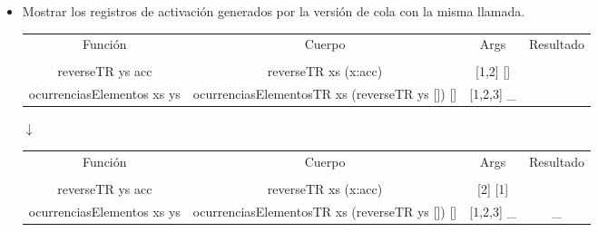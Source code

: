 \begin{enumerate}
{\begin{itemize}
{\begin{lstlisting}[language=Haskell]
{- occurencesTR: Funcion basada en recursion de cola que toma como argumentos 
    un elemento y una lista y devuelve la cantidad de veces que aparece el 
    elemento en la lista. 
    Debe iniciarse con occurencesTR _ _ 0, para su correcto funcionamiento. -}
occurencesTR :: Eq a => a -> [a] -> Int -> Int
occurencesTR _ [] acc = acc
occurencesTR x (y:ys) acc
    | x == y = occurencesTR x ys (acc + 1)
    | otherwise = occurencesTR x ys acc

{- reverseTR: Funcion basada en recursion de cola que toma como 
    argumento una lista y devuelve la lista invertida.
    Debe iniciarse con reverseTR _ [] para su correcto funcionamiento. -}
reverseTR :: [a] -> [a] -> [a]
reverseTR [] acc = acc
reverseTR (x:xs) acc = reverseTR xs (x:acc)\end{lstlisting}}

Usamos \verb|ocurrenciasElementos| para pasar de una entrada de dos argumentos, a una con 3. De igual manera, para procurar una lista idéntica al ejemplo, usamos \verb|reversaTR|, igual adaptada al uso de recursión de cola; para que la obtención de elementos pueda obtenerse de atrás para adelante y las duplas aparezcan en el orden correcto c:. 
            \item {Mostrar los registros de activación generados por la versión de cola con la misma llamada.
                \begin{center}
                \begin{NiceTabular}{|c c c c|}
                    Función & Cuerpo & Args & Resultado \\
                    &&&\\
                    reverseTR ys acc & reverseTR xs (x:acc) & [1,2] [] & \\ \hline 
                    ocurrenciasElementos xs ys & ocurrenciasElementosTR xs (reverseTR ys []) [] & [1,2,3] \_ & \\ \hline
                \end{NiceTabular}

                $\downarrow$
                
                \begin{NiceTabular}{|c c c c|}
                    Función & Cuerpo & Args & Resultado \\
                    &&&\\
                    reverseTR ys acc & reverseTR xs (x:acc) & [2] [1] & \\ \hline 
                    ocurrenciasElementos xs ys & ocurrenciasElementosTR xs (reverseTR ys []) [] & [1,2,3] \_ & \_ \\ \hline
                \end{NiceTabular}


\end{center}}
\end{itemize}}
\end{enumerate}
